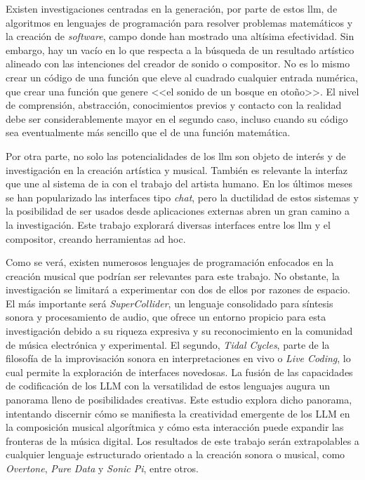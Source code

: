 Existen investigaciones centradas en la generación, por parte de estos \gls{llm}, de algoritmos en lenguajes de programación para resolver problemas matemáticos y la creación de \textit{software}, campo donde han mostrado una altísima efectividad. Sin embargo, hay un vacío en lo que respecta a la búsqueda de un resultado artístico alineado con las intenciones del creador de sonido o compositor. No es lo mismo crear un código de una función que eleve al cuadrado cualquier entrada numérica, que crear una función que genere <<el sonido de un bosque en otoño>>. El nivel de comprensión, abstracción, conocimientos previos y contacto con la realidad debe ser considerablemente mayor en el segundo caso, incluso cuando su código sea eventualmente más sencillo que el de una función matemática.

Por otra parte, no solo las potencialidades de los \gls{llm} son objeto de interés y de investigación en la creación artística y musical. También es relevante la interfaz que une al sistema de \gls{ia} con el trabajo del artista humano. En los últimos meses se han popularizado las interfaces tipo \textit{chat}, pero la ductilidad de estos sistemas y la posibilidad de ser usados desde aplicaciones externas abren un gran camino a la investigación. Este trabajo explorará diversas interfaces entre los \gls{llm} y el compositor, creando herramientas ad hoc.

Como se verá, existen numerosos lenguajes de programación enfocados en la creación musical que podrían ser relevantes para este trabajo. No obstante, la investigación se limitará a experimentar con dos de ellos por razones de espacio. El más importante será \textit{SuperCollider}, un lenguaje consolidado para síntesis sonora y procesamiento de audio, que ofrece un entorno propicio para esta investigación debido a su riqueza expresiva y su reconocimiento en la comunidad de música electrónica y experimental. El segundo, \textit{Tidal Cycles}, parte de la filosofía de la improvisación sonora en interpretaciones en vivo o \textit{Live Coding}, lo cual permite la exploración de interfaces novedosas. La fusión de las capacidades de codificación de los LLM con la versatilidad de estos lenguajes augura un panorama lleno de posibilidades creativas. Este estudio explora dicho panorama, intentando discernir cómo se manifiesta la creatividad emergente de los LLM en la composición musical algorítmica y cómo esta interacción puede expandir las fronteras de la música digital. Los resultados de este trabajo serán extrapolables a cualquier lenguaje estructurado orientado a la creación sonora o musical, como \textit{Overtone}, \textit{Pure Data} y \textit{Sonic Pi}, entre otros.

